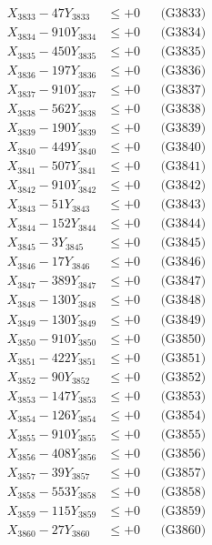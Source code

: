 \documentclass[a4paper,10pt]{article}
\begin{document}
{\begin{align}
X_{3833} - 47Y_{3833} &\leq +0 && \text{(G3833)} \\
X_{3834} - 910Y_{3834} &\leq +0 && \text{(G3834)} \\
X_{3835} - 450Y_{3835} &\leq +0 && \text{(G3835)} \\
X_{3836} - 197Y_{3836} &\leq +0 && \text{(G3836)} \\
X_{3837} - 910Y_{3837} &\leq +0 && \text{(G3837)} \\
X_{3838} - 562Y_{3838} &\leq +0 && \text{(G3838)} \\
X_{3839} - 190Y_{3839} &\leq +0 && \text{(G3839)} \\
X_{3840} - 449Y_{3840} &\leq +0 && \text{(G3840)} \\
\allowbreak
X_{3841} - 507Y_{3841} &\leq +0 && \text{(G3841)} \\
X_{3842} - 910Y_{3842} &\leq +0 && \text{(G3842)} \\
X_{3843} - 51Y_{3843} &\leq +0 && \text{(G3843)} \\
X_{3844} - 152Y_{3844} &\leq +0 && \text{(G3844)} \\
X_{3845} - 3Y_{3845} &\leq +0 && \text{(G3845)} \\
X_{3846} - 17Y_{3846} &\leq +0 && \text{(G3846)} \\
X_{3847} - 389Y_{3847} &\leq +0 && \text{(G3847)} \\
X_{3848} - 130Y_{3848} &\leq +0 && \text{(G3848)} \\
X_{3849} - 130Y_{3849} &\leq +0 && \text{(G3849)} \\
X_{3850} - 910Y_{3850} &\leq +0 && \text{(G3850)} \\
\allowbreak
X_{3851} - 422Y_{3851} &\leq +0 && \text{(G3851)} \\
X_{3852} - 90Y_{3852} &\leq +0 && \text{(G3852)} \\
X_{3853} - 147Y_{3853} &\leq +0 && \text{(G3853)} \\
X_{3854} - 126Y_{3854} &\leq +0 && \text{(G3854)} \\
X_{3855} - 910Y_{3855} &\leq +0 && \text{(G3855)} \\
X_{3856} - 408Y_{3856} &\leq +0 && \text{(G3856)} \\
X_{3857} - 39Y_{3857} &\leq +0 && \text{(G3857)} \\
X_{3858} - 553Y_{3858} &\leq +0 && \text{(G3858)} \\
X_{3859} - 115Y_{3859} &\leq +0 && \text{(G3859)} \\
X_{3860} - 27Y_{3860} &\leq +0 && \text{(G3860)} \\

\end{align}}
\end{document}
